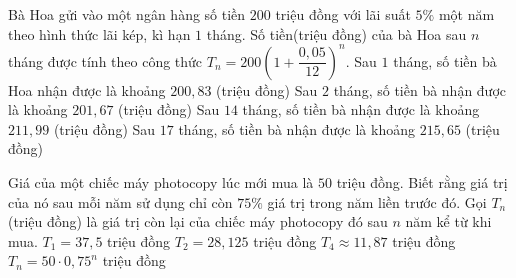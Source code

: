 \begin{ex}%
	Bà Hoa gửi vào một ngân hàng số tiền $200$ triệu đồng với lãi suất $5\%$ một năm theo hình thức  lãi kép, kì hạn $1$ tháng. Số tiền(triệu đồng) của bà Hoa sau $n$ tháng được tính theo công thức $T_n=200\left(1+\dfrac{0{,}05}{12}\right)^n$.
	 \choiceTF
		{\True  Sau $1$ tháng, số tiền bà Hoa nhận được là khoảng $200{,}83$ (triệu đồng)}
		{\True Sau $2$ tháng, số tiền  bà nhận được là khoảng $201{,}67$ (triệu đồng)}
		{\True  Sau $14$ tháng, số tiền bà nhận được là khoảng $211{,}99$ (triệu đồng)}
		{Sau $17$  tháng, số tiền bà nhận được là khoảng $215{,}65$ (triệu đồng)}
\end{ex}

\begin{ex}%
	Giá của một chiếc máy photocopy lúc mới mua là $50$ triệu đồng. Biết rằng giá trị của nó sau mỗi năm sử dụng chỉ còn $75\%$ giá trị trong  năm liền trước đó. Gọi $T_n$ (triệu đồng) là giá trị còn lại của chiếc máy photocopy đó sau $ n$ năm kể từ khi mua.
	 \choiceTF
		{\True  $T_1=37{,}5$ triệu đồng}
		 {\True $T_2=28{,}125$ triệu đồng}
		{$T_4\approx 11{,}87$ triệu  đồng}
		{\True $T_n=50\cdot0{,}75^n$  triệu đồng}
\end{ex}

